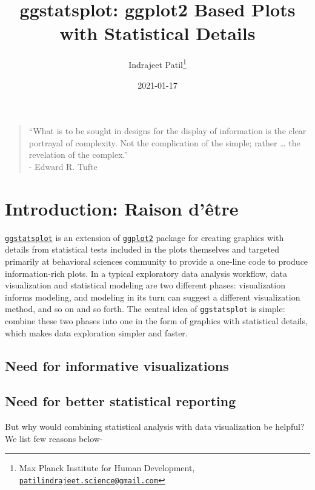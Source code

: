 \documentclass[
]{article}
\title{ggstatsplot: ggplot2 Based Plots with Statistical Details}
\author{Indrajeet Patil\footnote{Max Planck Institute for Human Development, \href{mailto:patilindrajeet.science@gmail.com}{\nolinkurl{patilindrajeet.science@gmail.com}}}}
\date{2021-01-17}
\begin{document}
\maketitle

{
\hypersetup{linkcolor=}
\setcounter{tocdepth}{2}
\tableofcontents
}
\begin{quote}
``What is to be sought in designs for the display of information is the clear
portrayal of complexity. Not the complication of the simple; rather \ldots{} the
revelation of the complex.''\\
- Edward R. Tufte
\end{quote}

\hypertarget{introduction-raison-duxeatre}{%
\section{Introduction: Raison d'être}\label{introduction-raison-duxeatre}}

\href{https://indrajeetpatil.github.io/ggstatsplot/}{\texttt{ggstatsplot}} is an extension
of \href{https://github.com/tidyverse/ggplot2}{\texttt{ggplot2}} package for creating
graphics with details from statistical tests included in the plots themselves
and targeted primarily at behavioral sciences community to provide a one-line
code to produce information-rich plots. In a typical exploratory data analysis
workflow, data visualization and statistical modeling are two different phases:
visualization informs modeling, and modeling in its turn can suggest a
different visualization method, and so on and so forth. The central idea of
\texttt{ggstatsplot} is simple: combine these two phases into one in the form of
graphics with statistical details, which makes data exploration simpler and
faster.

\hypertarget{need-for-informative-visualizations}{%
\subsection{Need for informative visualizations}\label{need-for-informative-visualizations}}

\hypertarget{need-for-better-statistical-reporting}{%
\subsection{Need for better statistical reporting}\label{need-for-better-statistical-reporting}}

But why would combining statistical analysis with data visualization be helpful?
We list few reasons below-
\end{document}
